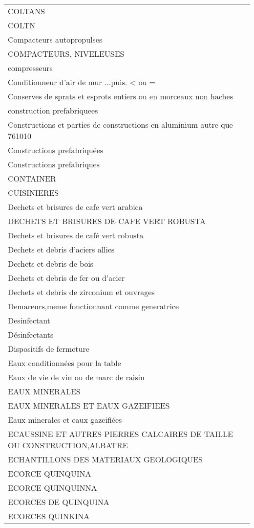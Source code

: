 \documentclass[
]{book}
\begin{document}
\begin{longtable}[t]{l}
COLTANS\\
COLTN\\
Compacteurs autopropulses\\
COMPACTEURS, NIVELEUSES\\
\addlinespace
compresseurs\\
Conditionneur d'air de mur ...puis. < ou =\\
Conserves de sprats et esprots entiers ou en morceaux non haches\\
construction prefabriquees\\
Constructions et parties de constructions en aluminium autre que 761010\\
\addlinespace
Constructions prefabriquées\\
Constructions prefabriques\\
CONTAINER\\
CUISINIERES\\
Dechets et brisures de cafe vert arabica\\
\addlinespace
DECHETS ET BRISURES DE CAFE VERT ROBUSTA\\
Dechets et brisures de café vert robusta\\
Dechets et debris d'aciers allies\\
Dechets et debris de bois\\
Dechets et debris de fer ou d'acier\\
\addlinespace
Dechets et debris de zirconium et ouvrages\\
Demareurs,meme fonctionnant comme generatrice\\
Desinfectant\\
Désinfectants\\
Dispositifs de fermeture\\
\addlinespace
Eaux conditionnées pour la table\\
Eaux de vie de vin ou de marc de raisin\\
EAUX MINERALES\\
EAUX MINERALES ET EAUX GAZEIFIEES\\
Eaux minerales et eaux gazeifiées\\
\addlinespace
ECAUSSINE ET AUTRES PIERRES CALCAIRES DE TAILLE OU CONSTRUCTION,ALBATRE\\
ECHANTILLONS DES MATERIAUX GEOLOGIQUES\\
ECORCE QUINQUINA\\
ECORCE QUINQUINNA\\
ECORCES DE QUINQUINA\\
\addlinespace
ECORCES QUINKINA\\

\end{longtable}
\end{document}
